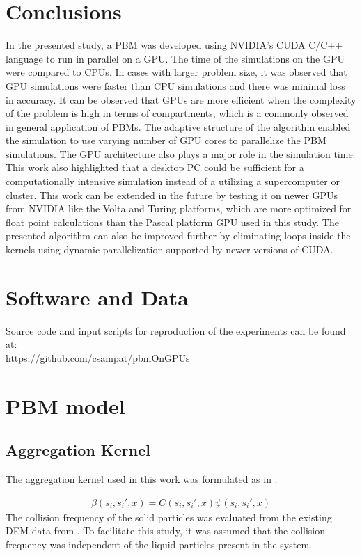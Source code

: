 \documentclass[preprint,10pt,authoryear,review]{elsarticle}
\begin{document}
\section{Conclusions}
\label{secConc}
In the presented study, a PBM was developed using NVIDIA's  CUDA C/C++ language 
to run in parallel on a GPU. The time of the simulations on the GPU were compared 
to CPUs. In cases with larger problem size, it was observed that GPU simulations 
were faster than CPU simulations and there was minimal loss in accuracy. 
It can be observed that GPUs are more efficient when the complexity of the 
problem is high in terms of compartments, which is a commonly observed in general 
application of PBMs. The adaptive structure of the algorithm 
enabled the simulation to use varying number of GPU cores to parallelize the PBM simulations.
The GPU architecture also plays a major role in the simulation time. This work also 
highlighted that a desktop PC could be sufficient for a computationally intensive 
simulation instead of a utilizing a supercomputer or cluster. 
This work can be extended in the future by testing it on newer GPUs from NVIDIA 
like the Volta and Turing platforms, which are more optimized for float point calculations 
than the Pascal platform GPU used in this study. The presented algorithm can also be 
improved further by eliminating loops inside the kernels using dynamic parallelization 
supported by newer versions of CUDA.


\section*{Software and Data}
\noindent Source code and input scripts for reproduction of the experiments can be found at:\\
\url{https://github.com/csampat/pbmOnGPUs}
\appendix

\section{PBM model}
\label{app:A}
\subsection{Aggregation Kernel}
\label{app:aggKernel}

The aggregation kernel used in this work was formulated as in \cite{Barrasso2015ces}: 

\begin{align}
\beta(s_i,s_i',x)=C(s_i,s_i',x)\psi(s_i,s_i',x)
\label{eqn:mthds_pbm_beta_kernal}
\end{align}
The collision frequency of the solid particles was evaluated from the existing 
DEM data from \citep{Sampat2018}. To facilitate this study, it was assumed that
the collision frequency was independent of the liquid particles present in the 
system.
\end{document}
